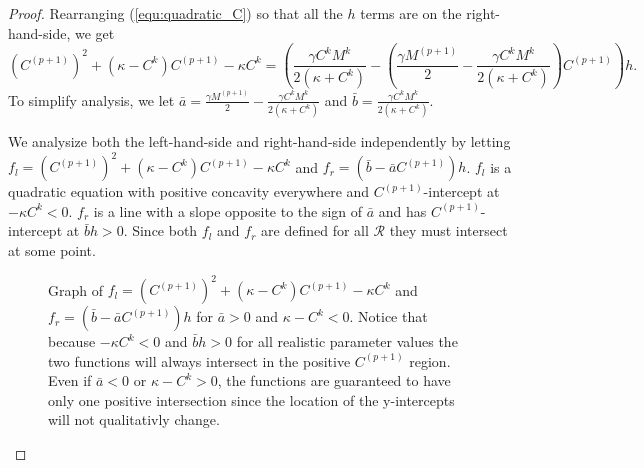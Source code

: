 \begin{proof}
  Rearranging (\ref{equ:quadratic_C}) so that all the $h$ terms are on the right-hand-side, we get
  \begin{equation}
    \left( C^{(p+1)} \right)^2 + \left(\kappa - C^{k}\right)C^{(p+1)} - \kappa C^{k} =  \left(\frac{\gamma C^k M^k}{2\left(\kappa + C^k\right)} - \left(\frac{\gamma M^{(p+1)}}{2} - \frac{\gamma C^k M^k}{2 \left(\kappa + C^k\right)} \right)C^{(p+1)} \right) h.
  \end{equation}
  To simplify analysis, we let $\bar{a} = \frac{\gamma M^{(p+1)}}{2} - \frac{\gamma C^k M^k}{2\left(\kappa + C^k\right)}$ and $\bar{b} = \frac{\gamma C^k M^k}{2\left(\kappa + C^k\right)}$.
  
  We analysize both the left-hand-side and right-hand-side independently by letting $f_l = \left( C^{(p+1)} \right)^2 + \left(\kappa - C^{k}\right)C^{(p+1)} - \kappa C^{k}$ and $f_r =  \left(\bar{b} - \bar{a} C^{(p+1)} \right) h$.
  $f_l$ is a quadratic equation with positive concavity everywhere and $C^{(p+1)}$-intercept at $-\kappa C^{k} < 0$.
  $f_r$ is a line with a slope opposite to the sign of $\bar{a}$ and has $C^{(p+1)}$-intercept at $\bar{b}h > 0$.
  Since both $f_l$ and $f_r$ are defined for all $\mathcal{R}$ they must intersect at some point.
  \begin{figure}
    \centering
  \label{fig:proof_pos_sol}
  \caption{Graph of $f_l = \left( C^{(p+1)} \right)^2 + \left(\kappa - C^{k}\right)C^{(p+1)} - \kappa C^{k}$ and $f_r =  \left(\bar{b} - \bar{a} C^{(p+1)} \right) h$ for $\bar{a} > 0$ and $\kappa - C^{k} < 0$. 
    Notice that because $-\kappa C^{k} < 0$ and $\bar{b} h > 0$ for all realistic parameter values the two functions will always intersect in the positive $C^{(p+1)}$ region.
    Even if $\bar{a} < 0$ or $\kappa - C^{k} > 0$, the functions are guaranteed to have only one positive intersection since the location of the y-intercepts will not qualitativly change.
  }
  \end{figure}
\end{proof}
  
